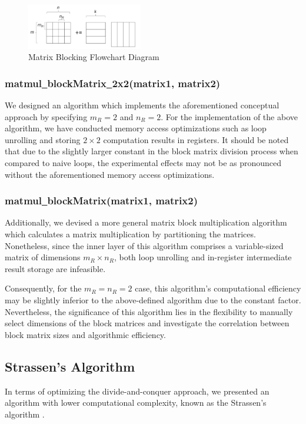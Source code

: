 \documentclass[conference]{IEEEtran}
\begin{document}
	\begin{figure}[htbp]
		\centerline{\includegraphics[width=0.45\textwidth]{fig1.png}}
		\caption{Matrix Blocking Flowchart Diagram}
		\label{matrixBlockingOverall}
	\end{figure}
	
	\subsubsection{matmul\underline{\ }blockMatrix\underline{\ }2x2(matrix1, matrix2)}
	We designed an algorithm which implements the aforementioned conceptual approach by specifying $m_R = 2$ and $n_R = 2$. For the implementation of the above algorithm, we have conducted memory access optimizations such as loop unrolling and storing $2 \times 2$ computation results in registers. It should be noted that due to the slightly larger constant in the block matrix division process when compared to naive loops, the experimental effects may not be as pronounced without the aforementioned memory access optimizations. 
	\subsubsection{matmul\underline{\ }blockMatrix(matrix1, matrix2)}
	Additionally, we devised a more general matrix block multiplication algorithm which calculates a matrix multiplication by partitioning the matrices. Nonetheless, since the inner layer of this algorithm comprises a variable-sized matrix of dimensions $m_R \times n_R$, both loop unrolling and in-register intermediate result storage are infeasible.
	
	 Consequently, for the $m_R = n_R = 2$ case, this algorithm's computational efficiency may be slightly inferior to the above-defined algorithm due to the constant factor. Nevertheless, the significance of this algorithm lies in the flexibility to manually select dimensions of the block matrices and investigate the correlation between block matrix sizes and algorithmic efficiency.
	 
	 \subsection{Strassen's Algorithm}
	 In terms of optimizing the divide-and-conquer approach, we presented an algorithm with lower computational complexity, known as the Strassen's algorithm \cite{b5}.
	 
\end{document}
